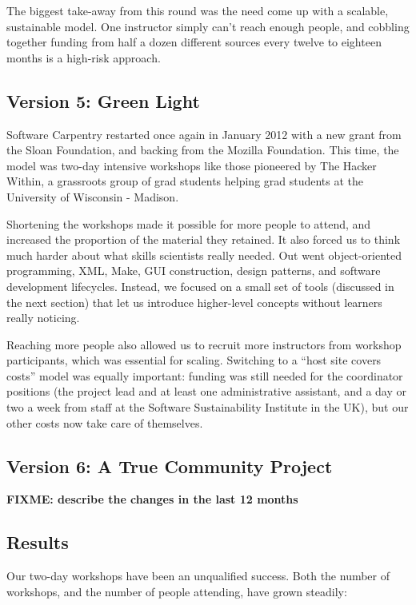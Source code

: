 \documentclass[10pt,a4paper,twocolumn]{article}
\newcommand{\fixme}[1]{\bf{FIXME: {#1}}}
\begin{document}
The biggest take-away from this round was the need come up with a
scalable, sustainable model. One instructor simply can't reach enough
people, and cobbling together funding from half a dozen different
sources every twelve to eighteen months is a high-risk approach.

\subsection*{Version 5: Green Light}

Software Carpentry restarted once again in January 2012 with a new
grant from the Sloan Foundation, and backing from the Mozilla
Foundation. This time, the model was two-day intensive workshops like
those pioneered by The Hacker Within, a grassroots group of grad
students helping grad students at the University of Wisconsin -
Madison.

Shortening the workshops made it possible for more people to attend,
and increased the proportion of the material they retained. It also
forced us to think much harder about what skills scientists really
needed. Out went object-oriented programming, XML, Make, GUI
construction, design patterns, and software development lifecycles.
Instead, we focused on a small set of tools (discussed in the next
section) that let us introduce higher-level concepts without learners
really noticing.

Reaching more people also allowed us to recruit more instructors from
workshop participants, which was essential for scaling. Switching to a
``host site covers costs'' model was equally important: funding was
still needed for the coordinator positions (the project lead and at
least one administrative assistant, and a day or two a week from staff
at the Software Sustainability Institute in the UK), but our other
costs now take care of themselves.

\subsection*{Version 6: A True Community Project}

\fixme{describe the changes in the last 12 months}

\subsection*{Results}

Our two-day workshops have been an unqualified success. Both the number
of workshops, and the number of people attending, have grown steadily:
\end{document}
